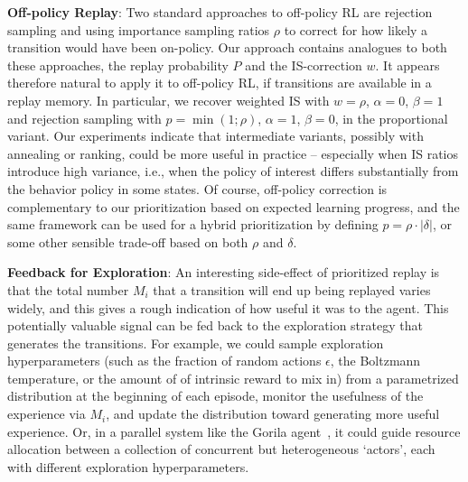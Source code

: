 \documentclass[a4paper]{article}
\begin{document}
{\bf Off-policy Replay}: 
Two standard approaches to off-policy RL are rejection sampling and using importance sampling 
ratios $\rho$ to correct for how likely a transition would have been on-policy.
Our approach contains analogues to both these approaches, the replay probability $P$ and the IS-correction $w$.
It appears therefore natural to apply it to off-policy RL, if transitions are available in a replay memory.
In particular, we recover weighted IS with $w=\rho$, $\alpha=0$, $\beta=1$ and 
rejection sampling with $p=\min(1;\rho)$, $\alpha=1$, $\beta=0$, in the proportional variant.
Our experiments indicate that intermediate variants, possibly with annealing or ranking, could be more useful
in practice -- especially when IS ratios introduce high variance, i.e., when the policy of interest
differs substantially from the behavior policy in some states.
Of course, off-policy correction is complementary to our prioritization based on expected learning progress,
and the same framework can be used for a hybrid prioritization by defining $p = \rho \cdot |\delta|$, 
or some other sensible trade-off based on both $\rho$ and $\delta$.



{\bf Feedback for Exploration}: 
An interesting side-effect of prioritized replay is that the total number $M_i$ that a transition will end up being replayed varies widely, 
and this gives a rough indication of how useful it was to the agent.
This potentially valuable signal can be fed back to the exploration strategy that generates the transitions. 
For example, we could sample exploration hyperparameters 
(such as the fraction of random actions $\epsilon$, the Boltzmann temperature, or the amount of of intrinsic reward to mix in) 
from a parametrized distribution at the beginning of each episode, monitor the usefulness of the experience via $M_i$, and update 
the distribution toward generating more useful experience.
Or, in a parallel system like the Gorila agent~\citep{gorila},
it could guide resource allocation between a collection of concurrent but heterogeneous `actors', each with different exploration hyperparameters.


\label{sec-prio-memory}
\end{document}
